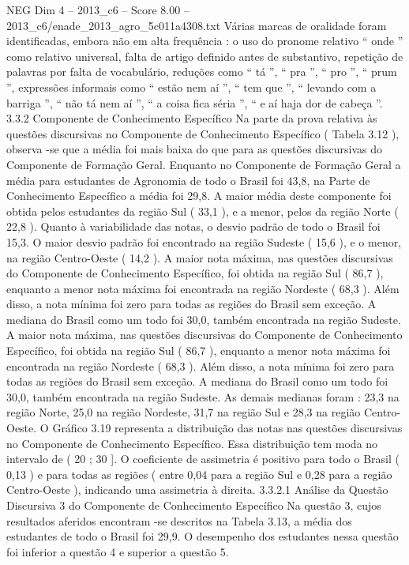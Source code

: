 \begin{textsample}{NEG Dim 4 – 2013\_c6 – Score 8.00 – 2013\_c6/enade\_2013\_agro\_5c011a4308.txt}
Várias marcas de oralidade foram identificadas, embora não em alta frequência : o uso do pronome relativo “ onde ” como relativo universal, falta de artigo definido antes de substantivo, repetição de palavras por falta de vocabulário, reduções como “ tá ”, “ pra ”, “ pro ”, “ prum ”, expressões informais como “ estão nem aí ”, “ tem que ”, “ levando com a barriga ”, “ não tá nem aí ”, “ a coisa fica séria ”, “ e aí haja dor de cabeça ”. 3.3.2 Componente de Conhecimento Específico Na parte da prova relativa às questões discursivas no Componente de Conhecimento Específico ( Tabela 3.12 ), observa -se que a média foi mais baixa do que para as questões discursivas do Componente de Formação Geral.
Enquanto no Componente de Formação Geral a média para estudantes de Agronomia de todo o Brasil foi 43,8, na Parte de Conhecimento Específico a média foi 29,8.
A maior média deste componente foi obtida pelos estudantes da região Sul ( 33,1 ), e a menor, pelos da região Norte ( 22,8 ).
Quanto à variabilidade das notas, o desvio padrão de todo o Brasil foi 15,3.
O maior desvio padrão foi encontrado na região Sudeste ( 15,6 ), e o menor, na região Centro-Oeste ( 14,2 ).
A maior nota máxima, nas questões discursivas do Componente de Conhecimento Específico, foi obtida na região Sul ( 86,7 ), enquanto a menor nota máxima foi encontrada na região Nordeste ( 68,3 ).
Além disso, a nota mínima foi zero para todas as regiões do Brasil sem exceção.
A mediana do Brasil como um todo foi 30,0, também encontrada na região Sudeste.
A maior nota máxima, nas questões discursivas do Componente de Conhecimento Específico, foi obtida na região Sul ( 86,7 ), enquanto a menor nota máxima foi encontrada na região Nordeste ( 68,3 ).
Além disso, a nota mínima foi zero para todas as regiões do Brasil sem exceção.
A mediana do Brasil como um todo foi 30,0, também encontrada na região Sudeste.
As demais medianas foram : 23,3 na região Norte, 25,0 na região Nordeste, 31,7 na região Sul e 28,3 na região Centro-Oeste.
O Gráfico 3.19 representa a distribuição das notas nas questões discursivas no Componente de Conhecimento Específico.
Essa distribuição tem moda no intervalo de ( 20 ; 30 ].
O coeficiente de assimetria é positivo para todo o Brasil ( 0,13 ) e para todas as regiões ( entre 0,04 para a região Sul e 0,28 para a região Centro-Oeste ), indicando uma assimetria à direita. 3.3.2.1 Análise da Questão Discursiva 3 do Componente de Conhecimento Específico Na questão 3, cujos resultados aferidos encontram -se descritos na Tabela 3.13, a média dos estudantes de todo o Brasil foi 29,9.
O desempenho dos estudantes nessa questão foi inferior a questão 4 e superior a questão 5.

\end{textsample}
